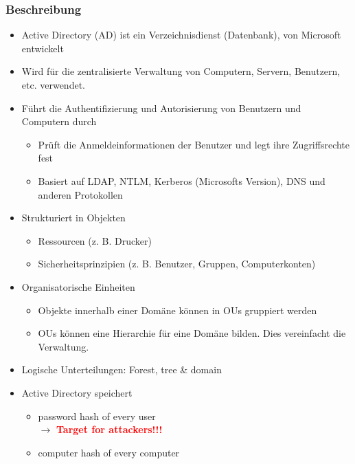 \subsubsection{Beschreibung}
\begin{itemize}
    \item Active Directory (AD) ist ein Verzeichnisdienst (Datenbank), von Microsoft entwickelt
    \item Wird für die zentralisierte Verwaltung von Computern, Servern, Benutzern, etc. verwendet.
    \item Führt die Authentifizierung und Autorisierung von Benutzern und Computern durch
    \begin{itemize}
        \item Prüft die Anmeldeinformationen der Benutzer und legt ihre Zugriffsrechte fest
        \item Basiert auf LDAP, NTLM, Kerberos (Microsofts Version), DNS und anderen Protokollen
    \end{itemize}
    \item Strukturiert in Objekten
    \begin{itemize}
        \item Ressourcen (z. B. Drucker)
        \item Sicherheitsprinzipien (z. B. Benutzer, Gruppen, Computerkonten)
    \end{itemize}
    \item Organisatorische Einheiten
    \begin{itemize}
        \item Objekte innerhalb einer Domäne können in OUs gruppiert werden
        \item OUs können eine Hierarchie für eine Domäne bilden. Dies vereinfacht die Verwaltung.
    \end{itemize}
    \item Logische Unterteilungen: Forest, tree \& domain
    \item Active Directory speichert
    \begin{itemize}
        \item password hash of every user\\ $\rightarrow$ \textcolor{red}{\textbf{Target for attackers!!!}}
        \item computer hash of every computer
    \end{itemize}
\end{itemize}

